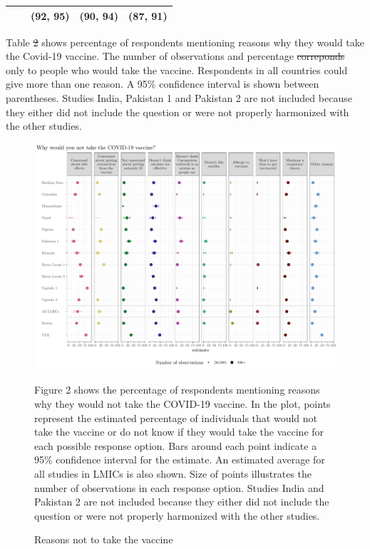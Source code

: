 \documentclass[
  12pt,
]{article}
\providecommand{\DIFaddtex}[1]{{\protect\color{blue}\uwave{#1}}} %
\providecommand{\DIFdeltex}[1]{{\protect\color{red}\sout{#1}}}                      %
\providecommand{\DIFaddFL}[1]{\DIFadd{#1}} %
\providecommand{\DIFdelFL}[1]{\DIFdel{#1}} %
\providecommand{\DIFaddbeginFL}{} %
\providecommand{\DIFaddendFL}{} %
\providecommand{\DIFdelbeginFL}{} %
\providecommand{\DIFdelendFL}{} %
\providecommand{\DIFadd}[1]{\texorpdfstring{\DIFaddtex{#1}}{#1}} %
\providecommand{\DIFdel}[1]{\texorpdfstring{\DIFdeltex{#1}}{}} %
\newcommand{\DIFscaledelfig}{0.5}
\newlength{\DIFdelgraphicswidth} %
\newlength{\DIFdelgraphicsheight} %
\newcommand{\DIFaddincludegraphics}[2][]{{\color{blue}\fbox{\DIFOincludegraphics[#1]{#2}}}} %
\newcommand{\DIFdelincludegraphics}[2][]{%
\sbox{\DIFdelgraphicsbox}{\DIFOincludegraphics[#1]{#2}}%
\settoboxwidth{\DIFdelgraphicswidth}{\DIFdelgraphicsbox} %
\settoboxtotalheight{\DIFdelgraphicsheight}{\DIFdelgraphicsbox} %
\scalebox{\DIFscaledelfig}{%
\parbox[b]{\DIFdelgraphicswidth}{\usebox{\DIFdelgraphicsbox}\\[-\baselineskip] \rule{\DIFdelgraphicswidth}{0em}}\llap{\resizebox{\DIFdelgraphicswidth}{\DIFdelgraphicsheight}{%
\setlength{\unitlength}{\DIFdelgraphicswidth}%
\begin{picture}(1,1)%
\thicklines\linethickness{2pt} %
{\color[rgb]{1,0,0}\put(0,0){\framebox(1,1){}}}%
{\color[rgb]{1,0,0}\put(0,0){\line( 1,1){1}}}%
{\color[rgb]{1,0,0}\put(0,1){\line(1,-1){1}}}%
\end{picture}%
}\hspace*{3pt}}} %
} %
\DeclareRobustCommand{\DIFaddbeginFL}{\DIFOaddbeginFL \let\includegraphics\DIFaddincludegraphics} %
\DeclareRobustCommand{\DIFaddendFL}{\DIFOaddendFL \let\includegraphics\DIFOincludegraphics} %
\DeclareRobustCommand{\DIFdelbeginFL}{\DIFOdelbeginFL \let\includegraphics\DIFdelincludegraphics} %
\DeclareRobustCommand{\DIFdelendFL}{\DIFOaddendFL \let\includegraphics\DIFOincludegraphics} %
\begin{document}
\begin{table}
\begin{threeparttable}
\begin{tabular}[t]{>{\raggedright\arraybackslash}p{8em}>{\centering\arraybackslash}p{4em}>{\centering\arraybackslash}p{4em}>{\centering\arraybackslash}p{4em}c}
 &  & (92, 95) & (90, 94) & (87, 91)\\
\bottomrule
\end{tabular}
\begin{tablenotes}
\item Table \DIFdelbeginFL \DIFdelFL{2 }\DIFdelendFL \DIFaddbeginFL \DIFaddFL{3 }\DIFaddendFL shows percentage of respondents mentioning reasons why they would take the Covid-19 vaccine. The number of observations and percentage \DIFdelbeginFL \DIFdelFL{correponds }\DIFdelendFL \DIFaddbeginFL \DIFaddFL{corresponds }\DIFaddendFL only to people who would take the vaccine. Respondents in all countries could give more than one reason. A 95\% confidence interval is shown between parentheses. Studies India, Pakistan 1 and Pakistan 2 are not included because they either did not include the question or were not properly harmonized with the other studies.
\end{tablenotes}
\end{threeparttable}
\end{table}

\begin{figure}[!ht]
\caption{Reasons not to take the vaccine \label{fig:fig2paper}}

\includegraphics{paper_files/figure-latex/fig2paper-1.pdf}

\scriptsize{Figure 2 shows the percentage of respondents mentioning reasons why they would not take the COVID-19 vaccine. In the plot, points represent the estimated percentage of individuals that would not take the vaccine or do not know if they would take the vaccine for each possible response option. Bars around each point indicate a 95\% confidence interval for the estimate. An estimated average for all studies in LMICs is also shown. Size of points illustrates the number of observations in each response option. Studies India and Pakistan 2 are not included because they either did not include the question or were not properly harmonized with the other studies.}
\end{figure}
\end{document}
